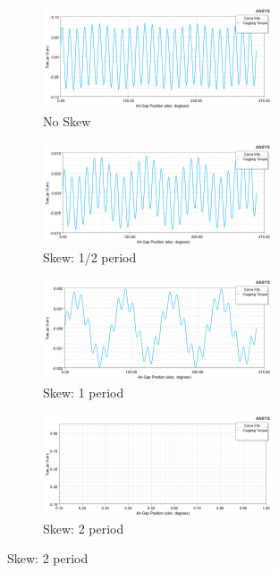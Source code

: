 \documentclass [a4 paper, 11pt, titlepage] {article}
\begin{document}
	\begin{figure}
	     \centering
	     \begin{subfigure}[b]{1.0\textwidth}
	         \centering
	         \includegraphics[height=3cm]{Tcogg_2426_a-0.png}
	         \caption{No Skew}
	         \label{fig:y equals x}
	     \end{subfigure}
	     \hfill
	     \begin{subfigure}[b]{1.0\textwidth}
	         \centering
	         \includegraphics[height=3cm]{Tcogg_2426_a-half.png}
	         \caption{Skew: 1/2 period}
	         \label{fig:three sin x}
	     \end{subfigure}
	     \hfill
	     \begin{subfigure}[b]{1.0\textwidth}
	         \centering
	         \includegraphics[height=3cm]{Tcogg_2426_a-1.png}
	         \caption{Skew: 1 period}
	         \label{fig:five over x}
	     \end{subfigure}
	     \hfill
	     \begin{subfigure}[b]{1.0\textwidth}
	         \centering
	         \includegraphics[height=3cm]{Tcogg_2426_a-2.png}
	         \caption{Skew: 2 period}
	         \label{fig:five over x}
	     \end{subfigure}

\end{figure}
\end{document}
